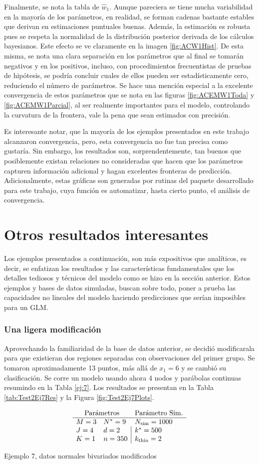 \documentclass[../Main/Main.tex]{subfiles}
\begin{document}
Finalmente, se nota la tabla de $\hat{w}_1$. Aunque pareciera se tiene mucha variabilidad en la mayoría de los parámetros, en realidad, se forman cadenas bastante estables que derivan en estimaciones puntuales buenas. Además, la estimación es robusta pues se respeta la normalidad de la distribución posterior derivada de los cálculos bayesianos. Este efecto se ve claramente en la imagen \ref{fig:ACW1Hist}. De esta misma, se nota una clara separación en los parámetros que al final se tomarán negativos y en los positivos, incluso, con procedimientos frecuentistas de pruebas de hipótesis, se podría concluir cuales de ellos pueden ser estadísticamente cero, reduciendo el número de parámetros. Se hace una mención especial a la excelente convergencia de estos parámetros que se nota en las figuras \ref{fig:ACEMW1Toda}
y \ref{fig:ACEMW1Parcial}, al ser realmente importantes para el modelo, controlando la curvatura de la frontera, vale la pena que sean estimados con precisión.

Es interesante notar, que la mayoría de los ejemplos presentados en este trabajo alcanzaron convergencia, pero, esta convergencia no fue tan precisa como gustaría. Sin embargo, los resultados son, sorprendentemente, tan buenos que posiblemente existan relaciones no consideradas que hacen que los parámetros capturen información adicional y hagan excelentes fronteras de predicción. Adicionalmente, estas gráficas son generadas por rutinas del paquete desarrollado para este trabajo, cuya función es automatizar, hasta cierto punto, el análisis de convergencia.

\section{Otros resultados interesantes}
Los ejemplos presentados a continuación, son más expositivos que analíticos, es decir, se enfatizan los resultados y las características fundamentales que los detalles tediosos y técnicos del modelo como se hizo en la sección anterior. Estos ejemplos y bases de datos simuladas, buscan sobre todo, poner a prueba las capacidades no lineales del modelo haciendo predicciones que serían imposibles para un GLM.

\subsubsection*{Una ligera modificación}
Aprovechando la familiaridad de la base de datos anterior, se decidió modificarala para que existieran dos regiones separadas con observaciones del primer grupo. Se tomaron aproximadamente 13 puntos, más allá de $x_1 = 6$ y se cambió su clasificación. Se corre un modelo usando ahora 4 nodos y parábolas continuas resumindo en la Tabla \ref{ej:7}. Los resultados se presentan en la Tabla \ref{tab:Test2Ej7Res} y la Figura \ref{fig:Test2Ej7Plots}.
\begin{table}[h]
$$\paramsmod{3}{4}{1}{9}{2}{350}{1000}{500}{2}$$
\caption{Ejemplo 7, datos normales bivariados modificados}
\label{ej:7}
\end{table}
\end{document}
